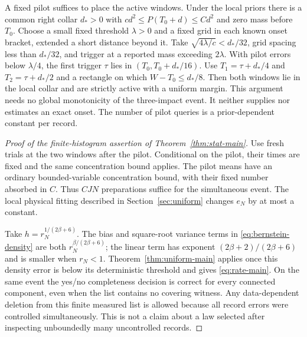 A fixed pilot suffices to place the active windows. Under the local
priors there is a common right collar $d_*>0$ with
$cd^2\le P(T_0+d)\le Cd^2$ and zero mass before $T_0$. Choose a
small fixed threshold $\lambda>0$ and a fixed grid in each known onset
bracket, extended a short distance beyond it. Take
$\sqrt{4\lambda/c}<d_*/32$, grid spacing less than $d_*/32$, and
trigger at a reported mass exceeding $2\lambda$. With pilot errors
below $\lambda/4$, the first trigger $\tau$ lies in
$(T_0,T_0+d_*/16)$. Use $T_1=\tau+d_*/4$ and
$T_2=\tau+d_*/2$ and a rectangle on which $W-T_0\le d_*/8$.
Then both windows lie in the local collar and are strictly active with
a uniform margin. This argument needs no global monotonicity of the
three-impact event. It neither supplies nor estimates an exact onset.
The number of pilot queries is a prior-dependent constant per record.

\begin{proof}[Proof of the finite-histogram assertion of
Theorem~\ref{thm:stat-main}]
Use fresh trials at the two windows after the pilot. Conditional on
the pilot, their times are fixed and the same concentration bound
applies. The pilot means have an ordinary bounded-variable concentration
bound, with their fixed number absorbed in $C$. Thus $CJN$ preparations
suffice for the simultaneous event. The local physical fitting described
in Section~\ref{sec:uniform} changes $e_N$ by at most a constant.

Take $h=r_N^{1/(2\beta+6)}$. The bias and square-root variance terms
in \eqref{eq:bernstein-density} are both
$r_N^{\beta/(2\beta+6)}$; the linear term has exponent
$(2\beta+2)/(2\beta+6)$ and is smaller when $r_N<1$.
Theorem~\ref{thm:uniform-main} applies once this density error is below
its deterministic threshold and gives \eqref{eq:rate-main}. On the
same event the yes/no completeness decision is correct for every
connected component, even when the list contains no covering witness.
Any data-dependent deletion from this finite measured list is allowed
because all record errors were controlled simultaneously. This is not
a claim about a law selected after inspecting unboundedly many uncontrolled
records.
\end{proof}

